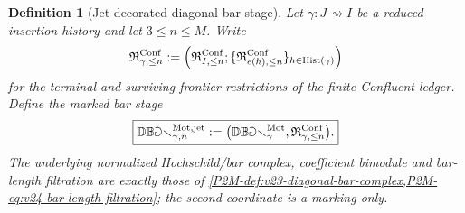 \documentclass[11pt]{article}
\newtheorem{definition}[theorem]{Definition}
\theoremstyle{remark}
\newcommand{\Mot}{\mathrm{Mot}}
\begin{document}
\begin{definition}[Jet-decorated diagonal-bar stage]
\label{P2M-def:v36-jet-decorated-diagonal-bar}
Let $\gamma:J\rightsquigarrow I$ be a reduced insertion history and let
$3\le n\le M$.  Write
\[
 \mathfrak R^{\rm Conf}_{\gamma,\le n}
 :=\left(
   \mathfrak R^{\rm Conf}_{I,\le n};
   \{\mathfrak R^{\rm Conf}_{e(h),\le n}\}_{h\in\operatorname{Hist}(\gamma)}
 \right)
\]
for the terminal and surviving frontier restrictions of the finite Confluent
ledger.  Define the marked bar stage
\begin{equation}
 \boxed{
 \mathbb{DBar}_{\gamma,n}^{\Mot,\mathrm{jet}}
 :=\bigl(
       \mathbb{DBar}_{\gamma}^{\Mot},
       \mathfrak R^{\rm Conf}_{\gamma,\le n}
     \bigr).}
 \label{P2M-eq:v36-jet-decorated-diagonal-bar}
\end{equation}
The underlying normalized Hochschild/bar complex, coefficient bimodule and
bar-length filtration are exactly those of
\cref{P2M-def:v23-diagonal-bar-complex,P2M-eq:v24-bar-length-filtration}; the second
coordinate is a marking only.
\end{definition}
\end{document}

